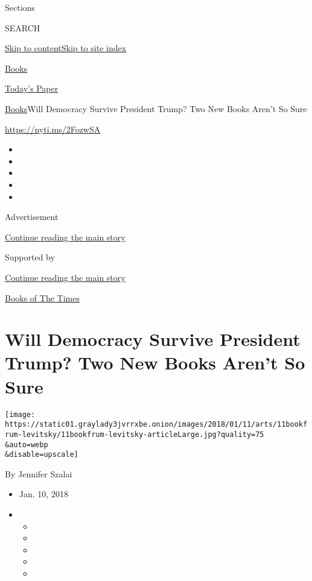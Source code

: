 Sections

SEARCH

\protect\hyperlink{site-content}{Skip to
content}\protect\hyperlink{site-index}{Skip to site index}

\href{https://www.nytimes3xbfgragh.onion/section/books}{Books}

\href{https://myaccount.nytimes3xbfgragh.onion/auth/login?response_type=cookie\&client_id=vi}{}

\href{https://www.nytimes3xbfgragh.onion/section/todayspaper}{Today's
Paper}

\href{/section/books}{Books}\textbar{}Will Democracy Survive President
Trump? Two New Books Aren't So Sure

\url{https://nyti.ms/2FozwSA}

\begin{itemize}
\item
\item
\item
\item
\item
\end{itemize}

Advertisement

\protect\hyperlink{after-top}{Continue reading the main story}

Supported by

\protect\hyperlink{after-sponsor}{Continue reading the main story}

\href{/column/books-of-the-times}{Books of The Times}

\hypertarget{will-democracy-survive-president-trump-two-new-books-arent-so-sure}{%
\section{Will Democracy Survive President Trump? Two New Books Aren't So
Sure}\label{will-democracy-survive-president-trump-two-new-books-arent-so-sure}}

\texttt{[image: https://static01.graylady3jvrrxbe.onion/images/2018/01/11/arts/11bookfrum-levitsky/11bookfrum-levitsky-articleLarge.jpg?quality=75\\\&auto=webp\\\&disable=upscale]}

By Jennifer Szalai

\begin{itemize}
\item
  Jan. 10, 2018
\item
  \begin{itemize}
  \item
  \item
  \item
  \item
  \item
  \end{itemize}
\end{itemize}

